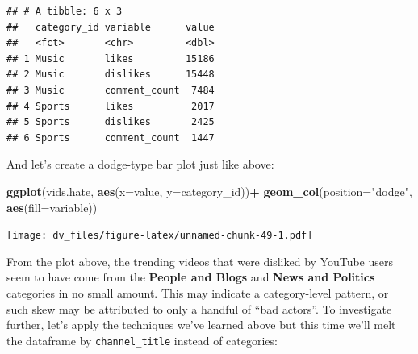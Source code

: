 \documentclass[]{article}
\newenvironment{Shaded}{\begin{snugshade}}{\end{snugshade}}
\newcommand{\CommentTok}[1]{\textcolor[rgb]{0.56,0.35,0.01}{\textit{#1}}}
\newcommand{\DataTypeTok}[1]{\textcolor[rgb]{0.13,0.29,0.53}{#1}}
\newcommand{\DecValTok}[1]{\textcolor[rgb]{0.00,0.00,0.81}{#1}}
\newcommand{\KeywordTok}[1]{\textcolor[rgb]{0.13,0.29,0.53}{\textbf{#1}}}
\newcommand{\NormalTok}[1]{#1}
\newcommand{\OperatorTok}[1]{\textcolor[rgb]{0.81,0.36,0.00}{\textbf{#1}}}
\newcommand{\StringTok}[1]{\textcolor[rgb]{0.31,0.60,0.02}{#1}}
\begin{document}
\begin{Shaded}
\end{Shaded}

\begin{verbatim}
## # A tibble: 6 x 3
##   category_id variable      value
##   <fct>       <chr>         <dbl>
## 1 Music       likes         15186
## 2 Music       dislikes      15448
## 3 Music       comment_count  7484
## 4 Sports      likes          2017
## 5 Sports      dislikes       2425
## 6 Sports      comment_count  1447
\end{verbatim}

And let's create a dodge-type bar plot just like above:

\begin{Shaded}
\begin{Highlighting}[]
\KeywordTok{ggplot}\NormalTok{(vids.hate, }\KeywordTok{aes}\NormalTok{(}\DataTypeTok{x=}\NormalTok{value, }\DataTypeTok{y=}\NormalTok{category_id))}\OperatorTok{+}
\StringTok{  }\KeywordTok{geom_col}\NormalTok{(}\DataTypeTok{position=}\StringTok{"dodge"}\NormalTok{, }\KeywordTok{aes}\NormalTok{(}\DataTypeTok{fill=}\NormalTok{variable))}
\end{Highlighting}
\end{Shaded}

\texttt{[image: dv\_files/figure-latex/unnamed-chunk-49-1.pdf]}

From the plot above, the trending videos that were disliked by YouTube
users seem to have come from the \textbf{People and Blogs} and
\textbf{News and Politics} categories in no small amount. This may
indicate a category-level pattern, or such skew may be attributed to
only a handful of ``bad actors''. To investigate further, let's apply
the techniques we've learned above but this time we'll melt the
dataframe by \texttt{channel\_title} instead of categories:
\end{document}
